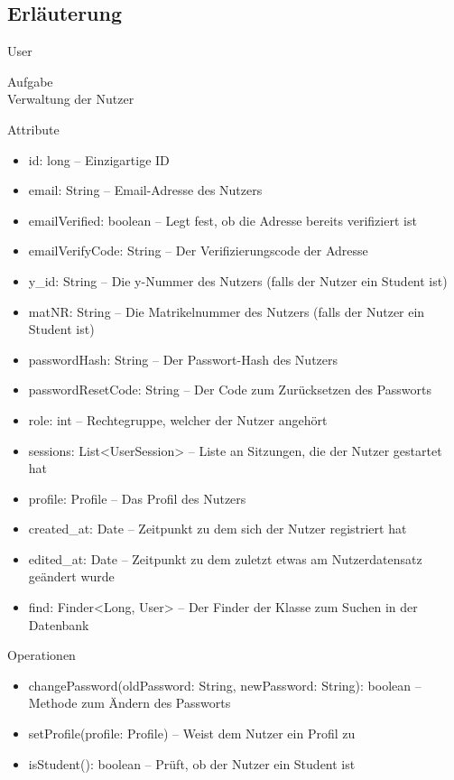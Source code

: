 \subsection{Erläuterung}
\begin{class}{80}{User}
\item[Aufgabe]~\\
Verwaltung der Nutzer
\item[Attribute]~\\
\begin{itemize}
\item id: long -- Einzigartige ID
\item email: String -- Email-Adresse des Nutzers
\item emailVerified: boolean -- Legt fest, ob die Adresse bereits verifiziert ist
\item emailVerifyCode: String -- Der Verifizierungscode der Adresse
\item y\_id: String -- Die y-Nummer des Nutzers (falls der Nutzer ein Student ist)
\item matNR: String -- Die Matrikelnummer des Nutzers (falls der Nutzer ein Student ist)
\item passwordHash: String -- Der Passwort-Hash des Nutzers
\item passwordResetCode: String -- Der Code zum Zurücksetzen des Passworts
\item role: int -- Rechtegruppe, welcher der Nutzer angehört
\item sessions: List<UserSession> -- Liste an Sitzungen, die der Nutzer gestartet hat
\item profile: Profile -- Das Profil des Nutzers
\item created\_at: Date -- Zeitpunkt zu dem sich der Nutzer registriert hat
\item edited\_at: Date -- Zeitpunkt zu dem zuletzt etwas am Nutzerdatensatz geändert wurde
\item find: Finder<Long, User> -- Der Finder der Klasse zum Suchen in der Datenbank
\end{itemize}
\item[Operationen]~\\
\begin{itemize}
\item changePassword(oldPassword: String, newPassword: String): boolean -- Methode zum Ändern des Passworts
\item setProfile(profile: Profile) -- Weist dem Nutzer ein Profil zu
\item isStudent(): boolean -- Prüft, ob der Nutzer ein Student ist

\end{itemize}
\end{class}
